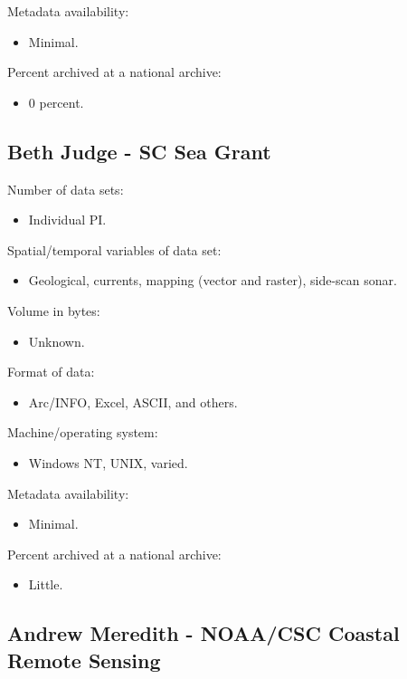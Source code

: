 Metadata availability:
\begin{itemize}
  \item Minimal.
\end{itemize}

Percent archived at a national archive:
\begin{itemize}
  \item 0 percent.
\end{itemize}

\subsection{Beth Judge - SC Sea Grant}

Number of data sets:
\begin{itemize}
  \item Individual PI.
\end{itemize}

Spatial/temporal variables of data set:
\begin{itemize}
  \item Geological, currents, mapping (vector and raster), side-scan sonar.
\end{itemize}

Volume in bytes:
\begin{itemize}
  \item Unknown.
\end{itemize}

Format of data:
\begin{itemize}
  \item Arc/INFO, Excel, ASCII, and others.
\end{itemize}

Machine/operating system:
\begin{itemize}
  \item Windows NT, UNIX, varied.
\end{itemize}

Metadata availability:
\begin{itemize}
  \item Minimal.
\end{itemize}

Percent archived at a national archive:
\begin{itemize}
  \item Little.
\end{itemize}

\subsection{Andrew Meredith - NOAA/CSC Coastal Remote Sensing}

